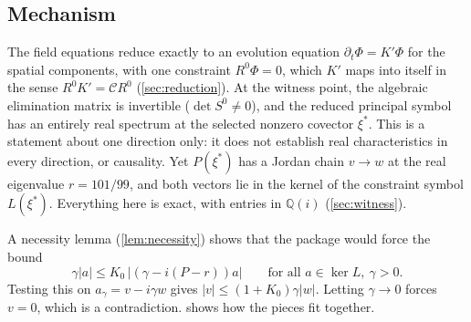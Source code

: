 \documentclass[11pt]{article}
\theoremstyle{plain}
\theoremstyle{definition}
\theoremstyle{remark}
\newcommand{\Q}{\mathbb{Q}}
\newcommand{\Ccal}{\mathcal{C}}
\begin{document}
\begin{center}
\end{center}

\subsection{Mechanism}\label{sec:intro-mechanism}

The field equations reduce exactly to an evolution equation $\partial_t\Phi = K'\Phi$ for the spatial components, with one constraint $R^0\Phi = 0$, which $K'$ maps into itself in the sense $R^0K' = \Ccal R^0$ (\cref{sec:reduction}). At the witness point, the algebraic elimination matrix is invertible ($\det S^0 \neq 0$), and the reduced principal symbol has an entirely real spectrum at the selected nonzero covector $\xi^*$. This is a statement about one direction only: it does not establish real characteristics in every direction, or causality.
Yet $P(\xi^*)$ has a Jordan chain $v \to w$ at the real eigenvalue $r = 101/99$, and both vectors lie in the kernel of the constraint symbol $L(\xi^*)$. Everything here is exact, with entries in $\Q(i)$ (\cref{sec:witness}).

A necessity lemma (\cref{lem:necessity}) shows that the package would force the bound
\[
  \gamma|a| \le K_0\,|(\gamma - i(P - r))a| \qquad\text{for all } a \in \ker L,\ \gamma > 0 .
\]
Testing this on $a_\gamma = v - i\gamma w$ gives $|v| \le (1+K_0)\gamma|w|$. Letting $\gamma \to 0$ forces $v = 0$, which is a contradiction.  shows how the pieces fit together.
\end{document}
